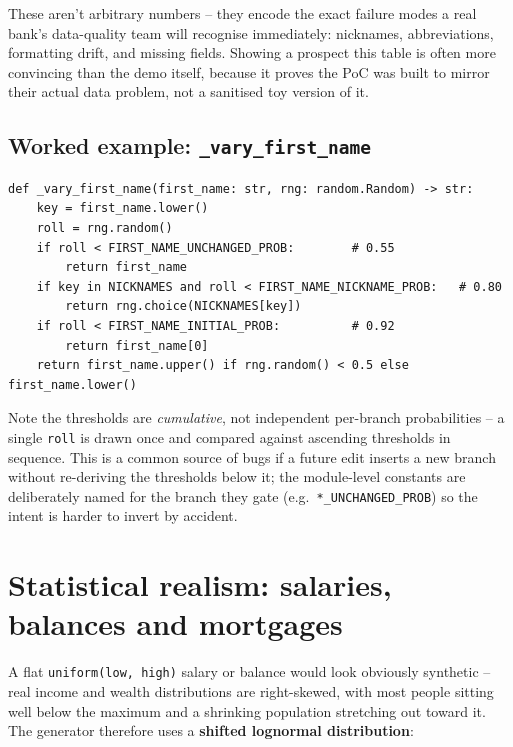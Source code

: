 \documentclass[11pt]{report}
\newcommand{\code}[1]{\lstinline[style=plain]!#1!}
\begin{document}
\begin{bizbox}
These aren't arbitrary numbers -- they encode the exact failure modes a real bank's data-quality team will recognise immediately: nicknames, abbreviations, formatting drift, and missing fields. Showing a prospect this table is often more convincing than the demo itself, because it proves the PoC was built to mirror their actual data problem, not a sanitised toy version of it.
\end{bizbox}

\subsection{Worked example: \texttt{\_vary\_first\_name}}

\begin{lstlisting}[style=py, caption={Cumulative-threshold noise sampling (\texttt{data\_generator.py})}]
def _vary_first_name(first_name: str, rng: random.Random) -> str:
    key = first_name.lower()
    roll = rng.random()
    if roll < FIRST_NAME_UNCHANGED_PROB:        # 0.55
        return first_name
    if key in NICKNAMES and roll < FIRST_NAME_NICKNAME_PROB:   # 0.80
        return rng.choice(NICKNAMES[key])
    if roll < FIRST_NAME_INITIAL_PROB:          # 0.92
        return first_name[0]
    return first_name.upper() if rng.random() < 0.5 else first_name.lower()
\end{lstlisting}

\begin{engbox}
Note the thresholds are \emph{cumulative}, not independent per-branch probabilities -- a single \code{roll} is drawn once and compared against ascending thresholds in sequence. This is a common source of bugs if a future edit inserts a new branch without re-deriving the thresholds below it; the module-level constants are deliberately named for the branch they gate (e.g.\ \code{*_UNCHANGED_PROB}) so the intent is harder to invert by accident.
\end{engbox}

\section{Statistical realism: salaries, balances and mortgages}

A flat \code{uniform(low, high)} salary or balance would look obviously synthetic -- real income and wealth distributions are right-skewed, with most people sitting well below the maximum and a shrinking population stretching out toward it. The generator therefore uses a \textbf{shifted lognormal distribution}:
\end{document}
